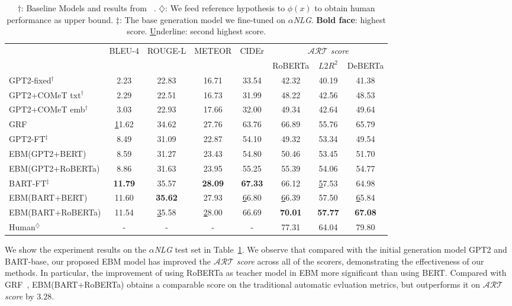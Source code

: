 \begin{table}[ht]
\centering
\small
\begin{tabular}{lccccccc}
\toprule
\multirow{2}{*}{} & \multirow{2}{*}{BLEU-4} & \multirow{2}{*}{ROUGE-L} & \multirow{2}{*}{METEOR} & \multirow{2}{*}{CIDEr} & \multicolumn{3}{c}{$\mathcal{ART}$ \textit{score}} \\ \cline{6-8}
 &  &  &  &  & RoBERTa & $L2R^2$ & DeBERTa \\ \midrule
GPT2-fixed$^{\dagger}$ & 2.23 & 22.83 & 16.71 & 33.54 & 42.32 & 40.19 & 41.38 \\
GPT2+COMeT txt$^{\dagger}$ & 2.29 & 22.51 & 16.73 & 31.99 & 48.22 & 42.56 & 48.53 \\
GPT2+COMeT emb$^{\dagger}$ & 3.03 & 22.93 & 17.66 & 32.00 & 49.34 & 42.64 & 49.64 \\
GRF~\citep{grf} & {\ul 11.62} & 34.62 & 27.76 & 63.76 & 66.89 & 55.76 & 65.79 \\ \midrule
GPT2-FT$^{\ddagger}$ & 8.49 & 31.09 & 22.87 & 54.10 & 49.32 & 53.34 & 49.54 \\ 
EBM(GPT2+BERT) & 8.59 & 31.27 & 23.43 & 54.80 & 50.46 & 53.45 & 51.70 \\
EBM(GPT2+RoBERTa) & 8.86 & 31.63 & 23.95 & 55.25 & 55.39 & 54.06 & 54.77 \\
BART-FT$^{\ddagger}$ & \textbf{11.79} & 35.57 & \textbf{28.09} & \textbf{67.33} & 66.12 & {\ul 57.53} & 64.98 \\
EBM(BART+BERT) & 11.60 & \textbf{35.62} & 27.93 & {\ul 66.80} & {\ul 66.39} & 57.50 & {\ul 65.84} \\
EBM(BART+RoBERTa) & 11.54 & {\ul 35.58} & {\ul 28.00} & 66.69 & \textbf{70.01} & \textbf{57.77} & \textbf{67.08} \\ \midrule
Human$^\diamondsuit$ & - & - & - & - & 77.31 & 64.04 & 79.80 \\ \bottomrule
\end{tabular}
\caption{
    $\dagger$: Baseline Models and results from ~\citet{Bhagavatula2020Abductive}. 
    $\diamondsuit$: We feed reference hypothesis to $\phi(x)$ to obtain human performance as upper bound.
    $\ddagger$: The base generation model we fine-tuned on $\alpha$\textit{NLG}.
    \textbf{Bold face}: highest score. {\ul Underline}: second highest score.
}
\label{exp-result}
\end{table}

We show the experiment results on the $\alpha$\textit{NLG}
test set in Table~\ref{exp-result}. We observe that compared with the initial
generation model GPT2 and BART-base, our proposed EBM model has improved the $\mathcal{ART}$ \textit{score}
across all of the scorers, demonstrating the effectiveness of our methods.
In particular, the improvement of using RoBERTa as teacher model in EBM
more significant than using BERT. %
Compared with GRF~\citep{grf}, EBM(BART+RoBERTa) obtains a comparable score on the traditional automatic evluation metrics, but outperforms
it on $\mathcal{ART}$ \textit{score} by $3.28$. 

